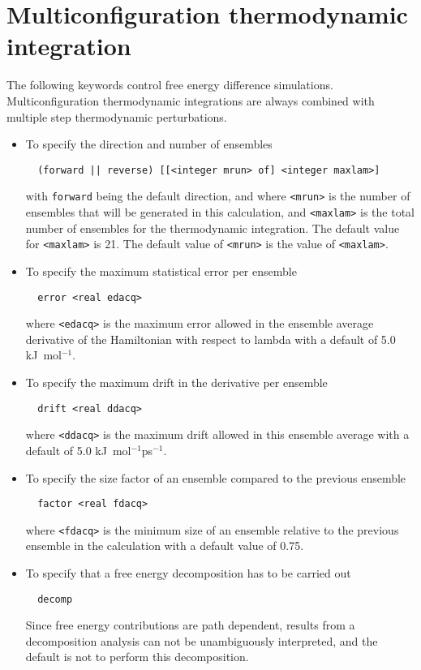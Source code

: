 \section{Multiconfiguration thermodynamic integration}
The following keywords control free energy difference simulations.
Multiconfiguration thermodynamic integrations are always combined
with multiple step thermodynamic perturbations.
\begin{itemize}
\item
To specify the direction and number of ensembles
\begin{verbatim}
  (forward || reverse) [[<integer mrun> of] <integer maxlam>]
\end{verbatim}
with {\tt forward} being the default direction, and
where \verb+<mrun>+ is the number of ensembles that will be generated in
this calculation, and \verb+<maxlam>+ is the total number of ensembles
for the thermodynamic integration. The default value for \verb+<maxlam>+
is 21. The default value of \verb+<mrun>+ is the value of \verb+<maxlam>+.
\item
To specify the maximum statistical error per ensemble
\begin{verbatim}
  error <real edacq>
\end{verbatim}
where \verb+<edacq>+ is the maximum error allowed in the ensemble average 
derivative of the Hamiltonian with respect to lambda with a default
of 5.0 kJ~mol$^{-1}$.
\item
To specify the maximum drift in the derivative per ensemble
\begin{verbatim}
  drift <real ddacq>
\end{verbatim}
where \verb+<ddacq>+ is the maximum drift allowed in this
ensemble average with a default of 5.0 kJ~mol$^{-1}$ps$^{-1}$.
\item
To specify the size factor of an ensemble compared to the previous
ensemble
\begin{verbatim}
  factor <real fdacq>
\end{verbatim}
where \verb+<fdacq>+ is the minimum size of an ensemble relative to the
previous ensemble in the calculation with a default value of 0.75.
\item
To specify that a free energy decomposition has to be carried out
\begin{verbatim}
  decomp
\end{verbatim}
Since free energy contributions are path dependent, results from a
decomposition analysis can not be unambiguously interpreted, and
the default is not to perform this decomposition.

\end{itemize}

